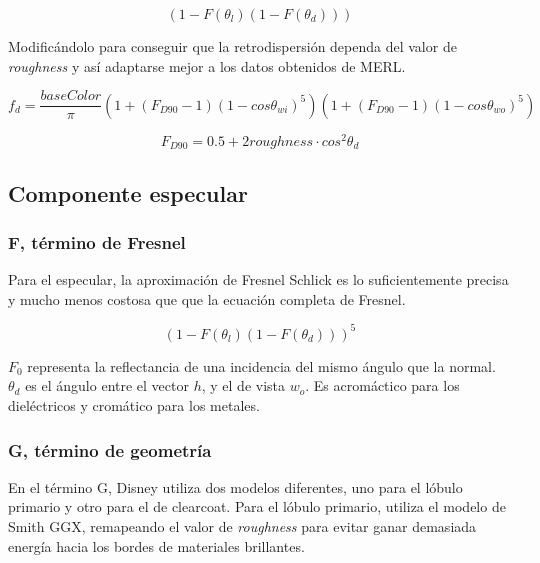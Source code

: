         \begin{equation}
            (1 - F(\theta_l) (1 - F(\theta_d)))
        \end{equation}
        \singlespacing
    
    
        Modific\'andolo para conseguir que la retrodispersi\'on dependa del valor de \textit{roughness} y as\'i
        adaptarse mejor a los datos obtenidos de MERL.
    
        \begin{equation}
        f_d = \frac{baseColor}{\pi}
        \left(  1 + (F_{D90} - 1)(1 - cos\theta_{wi})^5  \right)
        \left(  1 + (F_{D90} - 1)(1 - cos\theta_{wo})^5  \right)
        \end{equation}
        
        $$
        F_{D90} = 0.5 + 2roughness\cdot{cos^2\theta_d}
        $$
    
        \subsection{Componente especular}
            \subsubsection{F, t\'ermino de Fresnel}
                Para el especular, la aproximaci\'on de Fresnel Schlick es lo suficientemente precisa y mucho menos costosa que
                que la ecuaci\'on completa de Fresnel.
    
                \begin{equation}
                (1 - F(\theta_l) (1 - F(\theta_d)))^5
                \end{equation}
    
                $F_0$ representa la reflectancia de una incidencia del mismo \'angulo que la normal. $\theta_d$ es el \'angulo
                entre el vector $h$, y el de vista $w_o$. Es acrom\'actico para los diel\'ectricos y crom\'atico para los metales.
    
            \subsubsection{G, t\'ermino de geometr\'ia}
                En el t\'ermino G, Disney utiliza dos modelos diferentes, uno para el l\'obulo primario y otro para el de clearcoat.
                Para el l\'obulo primario, utiliza el modelo de Smith GGX, remapeando el valor de \textit{roughness} para evitar
                ganar demasiada energ\'ia hacia los bordes de materiales brillantes.
    
